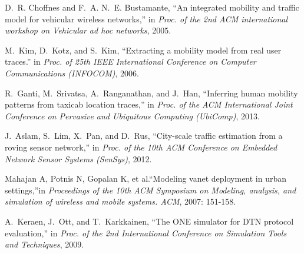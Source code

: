 \documentclass[10pt,journal,compsocconf,letterpaper]{IEEEtran}
\begin{document}
\begin{thebibliography}{11}
D.~R. Choffnes and F.~A. N.~E. Bustamante, ``An integrated mobility and traffic
  model for vehicular wireless networks,'' in \emph{Proc. of the 2nd ACM
  international workshop on Vehicular ad hoc networks}, 2005.

M.~Kim, D.~Kotz, and S.~Kim, ``Extracting a mobility model from real user
  traces.'' in \emph{Proc. of 25th IEEE International Conference on
  Computer Communications (INFOCOM)}, 2006.

R.~Ganti, M.~Srivatsa, A.~Ranganathan, and J.~Han, ``Inferring human mobility
  patterns from taxicab location traces,'' in \emph{Proc. of the ACM
  International Joint Conference on Pervasive and Ubiquitous Computing (UbiComp)}, 2013.

J.~Aslam, S.~Lim, X.~Pan, and D.~Rus, ``City-scale traffic estimation from a
  roving sensor network,'' in \emph{Proc. of the 10th ACM Conference on
  Embedded Network Sensor Systems (SenSys)}, 2012.

Mahajan A, Potnis N, Gopalan K, et al.``Modeling vanet deployment in urban settings,''in \emph{Proceedings of the 10th ACM Symposium on Modeling, analysis, and simulation of wireless and mobile systems. ACM}, 2007: 151-158.

A.~Keraen, J.~Ott, and T.~Karkkainen, ``The {ONE} simulator for {DTN} protocol
  evaluation,'' in \emph{Proc. of the 2nd International Conference on
  Simulation Tools and Techniques}, 2009.

\end{thebibliography}


%
\end{document}
